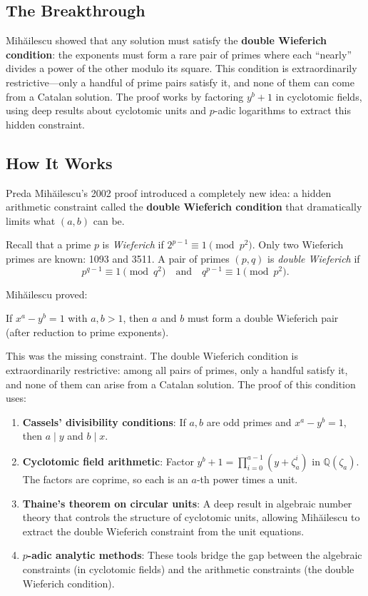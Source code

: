 \subsection{The Breakthrough}

Mihăilescu showed that any solution must satisfy the \textbf{double Wieferich condition}: the exponents must form a rare pair of primes where each ``nearly'' divides a power of the other modulo its square. This condition is extraordinarily restrictive---only a handful of prime pairs satisfy it, and none of them can come from a Catalan solution. The proof works by factoring $y^b + 1$ in cyclotomic fields, using deep results about cyclotomic units and $p$-adic logarithms to extract this hidden constraint.

\subsection{How It Works}

Preda Mihăilescu's 2002 proof introduced a completely new idea: a hidden arithmetic constraint called the \textbf{double Wieferich condition} that dramatically limits what $(a, b)$ can be.

Recall that a prime $p$ is \emph{Wieferich} if $2^{p-1} \equiv 1 \pmod{p^2}$. Only two Wieferich primes are known: 1093 and 3511. A pair of primes $(p, q)$ is \emph{double Wieferich} if
\[
p^{q-1} \equiv 1 \pmod{q^2} \quad \text{and} \quad q^{p-1} \equiv 1 \pmod{p^2}.
\]

Mihăilescu proved:

\begin{theorem}[Mihăilescu]
If $x^a - y^b = 1$ with $a, b > 1$, then $a$ and $b$ must form a double Wieferich pair (after reduction to prime exponents).
\end{theorem}

This was the missing constraint. The double Wieferich condition is extraordinarily restrictive: among all pairs of primes, only a handful satisfy it, and none of them can arise from a Catalan solution. The proof of this condition uses:

\begin{enumerate}
\item \textbf{Cassels' divisibility conditions}: If $a, b$ are odd primes and $x^a - y^b = 1$, then $a \mid y$ and $b \mid x$.
\item \textbf{Cyclotomic field arithmetic}: Factor $y^b + 1 = \prod_{i=0}^{a-1}(y + \zeta_a^i)$ in $\mathbb{Q}(\zeta_a)$. The factors are coprime, so each is an $a$-th power times a unit.
\item \textbf{Thaine's theorem on circular units}: A deep result in algebraic number theory that controls the structure of cyclotomic units, allowing Mihăilescu to extract the double Wieferich constraint from the unit equations.
\item \textbf{$p$-adic analytic methods}: These tools bridge the gap between the algebraic constraints (in cyclotomic fields) and the arithmetic constraints (the double Wieferich condition).
\end{enumerate}


